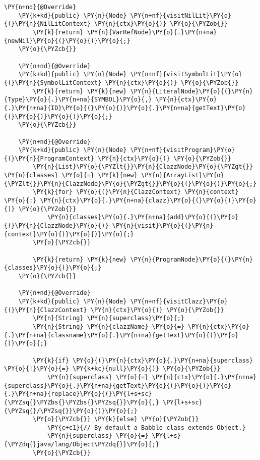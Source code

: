 \begin{Verbatim}[commandchars=\\\{\}]
    \PY{n+nd}{@Override}
    \PY{k+kd}{public} \PY{n}{Node} \PY{n+nf}{visitNilLit}\PY{o}{(}\PY{n}{NilLitContext} \PY{n}{ctx}\PY{o}{)} \PY{o}{\PYZob{}}
        \PY{k}{return} \PY{n}{VarRefNode}\PY{o}{.}\PY{n+na}{newNil}\PY{o}{(}\PY{o}{)}\PY{o}{;}
    \PY{o}{\PYZcb{}}

    \PY{n+nd}{@Override}
    \PY{k+kd}{public} \PY{n}{Node} \PY{n+nf}{visitSymbolLit}\PY{o}{(}\PY{n}{SymbolLitContext} \PY{n}{ctx}\PY{o}{)} \PY{o}{\PYZob{}}
        \PY{k}{return} \PY{k}{new} \PY{n}{LiteralNode}\PY{o}{(}\PY{n}{Type}\PY{o}{.}\PY{n+na}{SYMBOL}\PY{o}{,} \PY{n}{ctx}\PY{o}{.}\PY{n+na}{ID}\PY{o}{(}\PY{o}{)}\PY{o}{.}\PY{n+na}{getText}\PY{o}{(}\PY{o}{)}\PY{o}{)}\PY{o}{;}
    \PY{o}{\PYZcb{}}

    \PY{n+nd}{@Override}
    \PY{k+kd}{public} \PY{n}{Node} \PY{n+nf}{visitProgram}\PY{o}{(}\PY{n}{ProgramContext} \PY{n}{ctx}\PY{o}{)} \PY{o}{\PYZob{}}
        \PY{n}{List}\PY{o}{\PYZlt{}}\PY{n}{ClazzNode}\PY{o}{\PYZgt{}} \PY{n}{classes} \PY{o}{=} \PY{k}{new} \PY{n}{ArrayList}\PY{o}{\PYZlt{}}\PY{n}{ClazzNode}\PY{o}{\PYZgt{}}\PY{o}{(}\PY{o}{)}\PY{o}{;}
        \PY{k}{for} \PY{o}{(}\PY{n}{ClazzContext} \PY{n}{context} \PY{o}{:} \PY{n}{ctx}\PY{o}{.}\PY{n+na}{clazz}\PY{o}{(}\PY{o}{)}\PY{o}{)} \PY{o}{\PYZob{}}
            \PY{n}{classes}\PY{o}{.}\PY{n+na}{add}\PY{o}{(}\PY{o}{(}\PY{n}{ClazzNode}\PY{o}{)} \PY{n}{visit}\PY{o}{(}\PY{n}{context}\PY{o}{)}\PY{o}{)}\PY{o}{;}
        \PY{o}{\PYZcb{}}

        \PY{k}{return} \PY{k}{new} \PY{n}{ProgramNode}\PY{o}{(}\PY{n}{classes}\PY{o}{)}\PY{o}{;}
    \PY{o}{\PYZcb{}}

    \PY{n+nd}{@Override}
    \PY{k+kd}{public} \PY{n}{Node} \PY{n+nf}{visitClazz}\PY{o}{(}\PY{n}{ClazzContext} \PY{n}{ctx}\PY{o}{)} \PY{o}{\PYZob{}}
        \PY{n}{String} \PY{n}{superclass}\PY{o}{;}
        \PY{n}{String} \PY{n}{clazzName} \PY{o}{=} \PY{n}{ctx}\PY{o}{.}\PY{n+na}{classname}\PY{o}{.}\PY{n+na}{getText}\PY{o}{(}\PY{o}{)}\PY{o}{;}

        \PY{k}{if} \PY{o}{(}\PY{n}{ctx}\PY{o}{.}\PY{n+na}{superclass} \PY{o}{!}\PY{o}{=} \PY{k+kc}{null}\PY{o}{)} \PY{o}{\PYZob{}}
            \PY{n}{superclass} \PY{o}{=} \PY{n}{ctx}\PY{o}{.}\PY{n+na}{superclass}\PY{o}{.}\PY{n+na}{getText}\PY{o}{(}\PY{o}{)}\PY{o}{.}\PY{n+na}{replace}\PY{o}{(}\PY{l+s+sc}{\PYZsq{}\PYZbs{}\PYZbs{}\PYZsq{}}\PY{o}{,} \PY{l+s+sc}{\PYZsq{}/\PYZsq{}}\PY{o}{)}\PY{o}{;}
        \PY{o}{\PYZcb{}} \PY{k}{else} \PY{o}{\PYZob{}}
            \PY{c+c1}{// By default a Babble class extends Object.}
            \PY{n}{superclass} \PY{o}{=} \PY{l+s}{\PYZdq{}java/lang/Object\PYZdq{}}\PY{o}{;}
        \PY{o}{\PYZcb{}}


\end{Verbatim}
